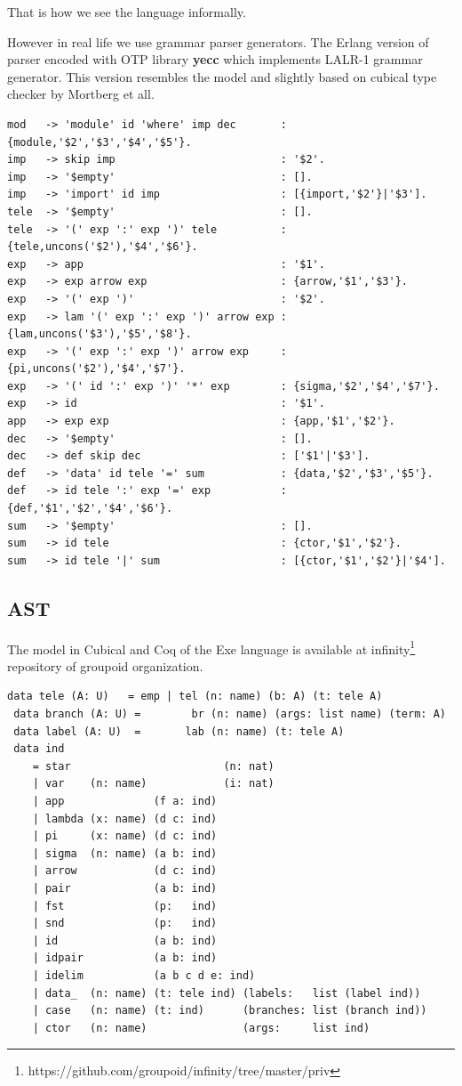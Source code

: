 \documentclass[11pt,oneside]{article}
\begin{document}
That is how we see the language informally.

\newpage

However in real life we use grammar parser generators.
The Erlang version of parser encoded with OTP library {\bf yecc} which implements
LALR-1 grammar generator. This version resembles the model and slightly based on cubical
type checker by Mortberg et all.

\begin{lstlisting}
mod   -> 'module' id 'where' imp dec       : {module,'$2','$3','$4','$5'}.
imp   -> skip imp                          : '$2'.
imp   -> '$empty'                          : [].
imp   -> 'import' id imp                   : [{import,'$2'}|'$3'].
tele  -> '$empty'                          : [].
tele  -> '(' exp ':' exp ')' tele          : {tele,uncons('$2'),'$4','$6'}.
exp   -> app                               : '$1'.
exp   -> exp arrow exp                     : {arrow,'$1','$3'}.
exp   -> '(' exp ')'                       : '$2'.
exp   -> lam '(' exp ':' exp ')' arrow exp : {lam,uncons('$3'),'$5','$8'}.
exp   -> '(' exp ':' exp ')' arrow exp     : {pi,uncons('$2'),'$4','$7'}.
exp   -> '(' id ':' exp ')' '*' exp        : {sigma,'$2','$4','$7'}.
exp   -> id                                : '$1'.
app   -> exp exp                           : {app,'$1','$2'}.
dec   -> '$empty'                          : [].
dec   -> def skip dec                      : ['$1'|'$3'].
def   -> 'data' id tele '=' sum            : {data,'$2','$3','$5'}.
def   -> id tele ':' exp '=' exp           : {def,'$1','$2','$4','$6'}.
sum   -> '$empty'                          : [].
sum   -> id tele                           : {ctor,'$1','$2'}.
sum   -> id tele '|' sum                   : [{ctor,'$1','$2'}|'$4'].
\end{lstlisting}

\subsection{AST}

The model in Cubical and Coq of the Exe language is available at
infinity\footnote{https://github.com/groupoid/infinity/tree/master/priv}
repository of groupoid organization.

\begin{lstlisting}[mathescape=true]
 data tele (A: U)   = emp | tel (n: name) (b: A) (t: tele A)
 data branch (A: U) =        br (n: name) (args: list name) (term: A)
 data label (A: U)  =       lab (n: name) (t: tele A)
 data ind
    = star                        (n: nat)
    | var    (n: name)            (i: nat)
    | app              (f a: ind)
    | lambda (x: name) (d c: ind)
    | pi     (x: name) (d c: ind)
    | sigma  (n: name) (a b: ind)
    | arrow            (d c: ind)
    | pair             (a b: ind)
    | fst              (p:   ind)
    | snd              (p:   ind)
    | id               (a b: ind)
    | idpair           (a b: ind)
    | idelim           (a b c d e: ind)
    | data_  (n: name) (t: tele ind) (labels:   list (label ind))
    | case   (n: name) (t: ind)      (branches: list (branch ind))
    | ctor   (n: name)               (args:     list ind)
\end{lstlisting}
\end{document}
